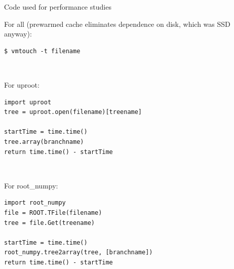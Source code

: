 \documentclass[aspectratio=169]{beamer}
\begin{document}
\begin{frame}[fragile]{Code used for performance studies}
\vspace{0.5 cm}
\scriptsize

{\normalsize For all (prewarmed cache eliminates dependence on disk, which was SSD anyway):}

\begin{verbatim}
$ vmtouch -t filename
\end{verbatim}

\vspace{0.5 cm}
\mbox{ } \hfill \begin{minipage}{0.5\linewidth}
{\normalsize For uproot:}

\begin{verbatim}
import uproot
tree = uproot.open(filename)[treename]

startTime = time.time()
tree.array(branchname)
return time.time() - startTime
\end{verbatim}
\end{minipage} \hfill \mbox{ }

\vspace{0.5 cm}
\hfill \begin{minipage}{0.5\linewidth}
{\normalsize For root\_numpy:}

\begin{verbatim}
import root_numpy
file = ROOT.TFile(filename)
tree = file.Get(treename)

startTime = time.time()
root_numpy.tree2array(tree, [branchname])
return time.time() - startTime
\end{verbatim}
\end{minipage}
\end{frame}
\end{document}
